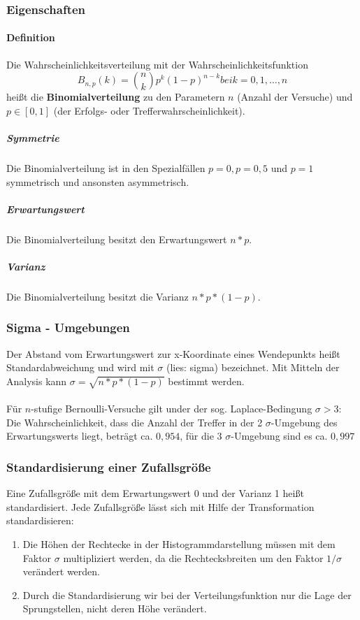 \documentclass[a4paper,10pt,DIV9, BCOR12mm, oneside,openright,openbib]{scrreprt}
\theoremstyle{definition}
\theoremstyle{plain}
\begin{document}
\subsubsection{Eigenschaften}
\paragraph{Definition}
Die Wahrscheinlichkeitsverteilung mit der Wahrscheinlichkeitsfunktion
\[  B_{n,p}(k) = \binom nk p^k (1-p)^{n-k} bei k=0,1,\dotsc, n \]
heißt die \textbf{Binomialverteilung} zu den Parametern $ n $ (Anzahl der Versuche) und $ p\in [0,1] $ (der Erfolgs- oder Trefferwahrscheinlichkeit).\\

\subparagraph{Symmetrie}
Die Binomialverteilung ist in den Spezialfällen $ p = 0, p = 0{,}5 $ und $ p = 1 $ symmetrisch und ansonsten asymmetrisch.
\subparagraph{Erwartungswert}
Die Binomialverteilung besitzt den Erwartungswert $ n*p $.
\subparagraph{Varianz}
Die Binomialverteilung besitzt die Varianz $ n*p*(1-p) $.

\subsubsection{Sigma - Umgebungen}
Der Abstand vom Erwartungswert zur x-Koordinate eines Wendepunkts heißt Standardabweichung und wird mit $ \sigma $ (lies: sigma) bezeichnet.
Mit Mitteln der Analysis kann $ \sigma = \sqrt{n*p*(1-p)} $
bestimmt werden.\\
\\
Für $ n $-stufige Bernoulli-Versuche gilt under der sog. Laplace-Bedingung $ \sigma > 3 $:\\
Die Wahrscheinlichkeit, dass die Anzahl der Treffer in der 2 $ \sigma $-Umgebung des Erwartungswerts liegt, beträgt ca. $ 0,954 $, für die  3 $ \sigma $-Umgebung sind es ca. $ 0,997 $

\subsubsection{Standardisierung einer Zufallsgröße}
Eine Zufallsgröße mit dem Erwartungswert 0 und der Varianz 1 heißt standardisiert. Jede Zufallsgröße lässt sich mit Hilfe der Transformation standardisieren:
\begin{enumerate}
 \item Die Höhen der Rechtecke in der Histogrammdarstellung müssen mit dem Faktor $ \sigma $ multipliziert werden, da die Rechtecksbreiten um den Faktor $ 1/\sigma $ verändert werden.\\
 \item Durch die Standardisierung wir bei der Verteilungsfunktion nur die Lage der Sprungstellen, nicht deren Höhe verändert. 
\end{enumerate}
\end{document}
